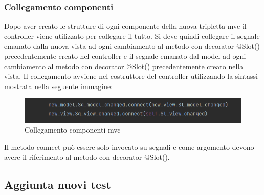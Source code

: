 \subsubsection{Collegamento componenti}
Dopo aver creato le strutture di ogni componente della nuova tripletta mvc il controller viene utilizzato per collegare il tutto. 
Si deve quindi collegare il segnale emanato dalla nuova vista ad ogni cambiamento al metodo con decorator @Slot() precedentemente creato nel controller e il segnale emanato dal model ad ogni cambiamento al metodo con decorator @Slot() precedentemente creato nella vista. Il collegamento avviene nel costruttore del controller utilizzando la sintassi mostrata nella seguente immagine:
\begin{figure}[H]
    \centering
    \includegraphics[scale = 0.50]{components/img/collegamento-segnali-mvc.png}
    \caption{Collegamento componenti mvc}
    \label{fig:Collegamento componenti mvc}
\end{figure}
Il metodo connect può essere solo invocato su segnali e come argomento devono avere il riferimento al metodo con decorator @Slot().

\subsection{Aggiunta nuovi test}
